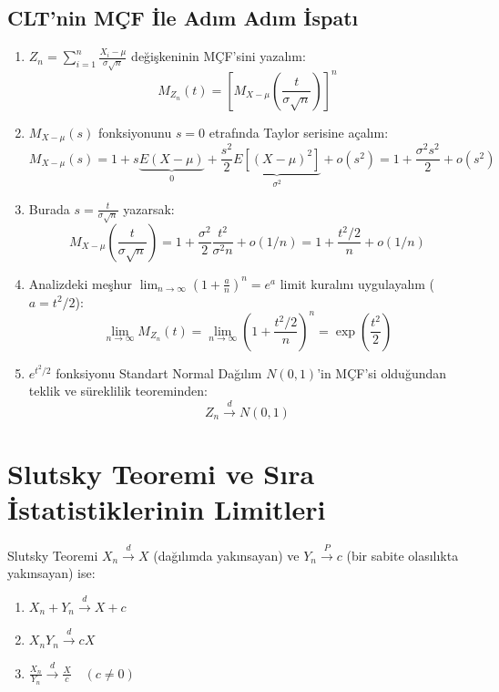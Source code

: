 \documentclass[12pt,a4paper]{article}
\begin{document}
\subsection{CLT'nin MÇF İle Adım Adım İspatı}
\begin{enumerate}
    \item $Z_n = \sum_{i=1}^n \frac{X_i - \mu}{\sigma\sqrt{n}}$ değişkeninin MÇF'sini yazalım:
    \begin{equation}
        M_{Z_n}(t) = \left[ M_{X - \mu}\left( \frac{t}{\sigma\sqrt{n}} \right) \right]^n
    \end{equation}
    \item $M_{X-\mu}(s)$ fonksiyonunu $s=0$ etrafında Taylor serisine açalım:
    \begin{equation}
        M_{X-\mu}(s) = 1 + s \underbrace{E(X - \mu)}_{0} + \frac{s^2}{2} \underbrace{E[(X - \mu)^2]}_{\sigma^2} + o(s^2) = 1 + \frac{\sigma^2 s^2}{2} + o(s^2)
    \end{equation}
    \item Burada $s = \frac{t}{\sigma\sqrt{n}}$ yazarsak:
    \begin{equation}
        M_{X-\mu}\left( \frac{t}{\sigma\sqrt{n}} \right) = 1 + \frac{\sigma^2}{2} \frac{t^2}{\sigma^2 n} + o(1/n) = 1 + \frac{t^2/2}{n} + o(1/n)
    \end{equation}
    \item Analizdeki meşhur $\lim_{n \to \infty} (1 + \frac{a}{n})^n = e^a$ limit kuralını uygulayalım ($a = t^2/2$):
    \begin{equation}
        \lim_{n \to \infty} M_{Z_n}(t) = \lim_{n \to \infty} \left( 1 + \frac{t^2/2}{n} \right)^n = \boxed{\exp\left( \frac{t^2}{2} \right)}
    \end{equation}
    \item $e^{t^2/2}$ fonksiyonu Standart Normal Dağılım $N(0, 1)$'in MÇF'si olduğundan teklik ve süreklilik teoreminden:
    \begin{equation}
        Z_n \xrightarrow{d} N(0, 1)
    \end{equation}
\end{enumerate}

\vspace{0.5em}
\section{Slutsky Teoremi ve Sıra İstatistiklerinin Limitleri}

\begin{tanim}{Slutsky Teoremi}
$X_n \xrightarrow{d} X$ (dağılımda yakınsayan) ve $Y_n \xrightarrow{P} c$ (bir sabite olasılıkta yakınsayan) ise:
\begin{enumerate}
    \item $X_n + Y_n \xrightarrow{d} X + c$
    \item $X_n Y_n \xrightarrow{d} c X$
    \item $\frac{X_n}{Y_n} \xrightarrow{d} \frac{X}{c} \quad (c \neq 0)$
\end{enumerate}
\end{tanim}
\end{document}
